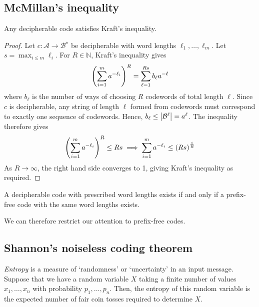 \subsection{McMillan's inequality}
\begin{theorem}
    Any decipherable code satisfies Kraft's inequality.
\end{theorem}
\begin{proof}
    Let \( c \colon \mathcal A \to \mathcal B^\star \) be decipherable with word lengths \( \ell_1, \dots, \ell_m \).
    Let \( s = \max_{i \leq m} \ell_i \).
    For \( R \in \mathbb N \), Kraft's inequality gives
    \[ \qty(\sum_{i=1}^m a^{-\ell_i})^R = \sum_{\ell = 1}^{Rs} b_\ell a^{-\ell} \]
    where \( b_\ell \) is the number of ways of choosing \( R \) codewords of total length \( \ell \).
    Since \( c \) is decipherable, any string of length \( \ell \) formed from codewords must correspond to exactly one sequence of codewords.
    Hence, \( b_\ell \leq \abs{\mathcal B^\ell} = a^\ell \).
    The inequality therefore gives
    \[ \qty(\sum_{i=1}^m a^{-\ell_i})^R \leq Rs \implies \sum_{i=1}^m a^{-\ell_i} \leq \qty(Rs)^{\frac{1}{R}} \]
    As \( R \to \infty \), the right hand side converges to 1, giving Kraft's inequality as required.
\end{proof}
\begin{corollary}
    A decipherable code with prescribed word lengths exists if and only if a prefix-free code with the same word lengths exists.
\end{corollary}
We can therefore restrict our attention to prefix-free codes.

\subsection{Shannon's noiseless coding theorem}
\emph{Entropy} is a measure of `randomness' or `uncertainty' in an input message.
Suppose that we have a random variable \( X \) taking a finite number of values \( x_1, \dots, x_n \) with probability \( p_1, \dots, p_n \).
Then, the entropy of this random variable is the expected number of fair coin tosses required to determine \( X \).
